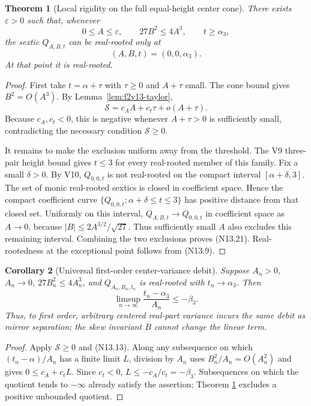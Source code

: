 \documentclass[11pt]{article}
\newtheorem{theorem}{Theorem}[section]
\newtheorem{corollary}[theorem]{Corollary}
\theoremstyle{definition}
\theoremstyle{remark}
\begin{document}
\begin{theorem}[Local rigidity on the full equal-height center cone]
\label{thm:f2v13-local-rigidity}
There exists \(\varepsilon>0\) such that, whenever
\[
 0\leq A\leq\varepsilon,\qquad 27B^2\leq4A^3,\qquad t\geq\alpha _3,
 \tag{N13.20}
\]
the sextic \(Q_{A,B,t}\) can be real-rooted only at
\[
 (A,B,t)=(0,0,\alpha _3).
 \tag{N13.21}
\]
At that point it is real-rooted.
\end{theorem}

\begin{proof}
First take \(t=\alpha+\tau\) with \(\tau\geq0\) and
\(A+\tau\) small.  The cone bound gives \(B^2=O(A^3)\).  By
Lemma~\ref{lem:f2v13-taylor},
\[
 \mathcal S=c_AA+c_t\tau+o(A+\tau).
 \tag{N13.22}
\]
Because \(c_A,c_t<0\), this is negative whenever \(A+\tau>0\) is
sufficiently small, contradicting the necessary condition
\(\mathcal S\geq0\).

It remains to make the exclusion uniform away from the threshold.  The V9
three-pair height bound gives \(t\leq3\) for every real-rooted member of
this family.  Fix a small \(\delta>0\).  By V10,
\(Q_{0,0,t}\) is not real-rooted on the compact interval
\([\alpha+\delta,3]\).  The set of monic real-rooted sextics is closed in
coefficient space.  Hence the compact coefficient curve
\(\{Q_{0,0,t}:\alpha+\delta\leq t\leq3\}\) has positive distance from that
closed set.  Uniformly on this interval,
\(Q_{A,B,t}\to Q_{0,0,t}\) in coefficient space as \(A\to0\), because
\(|B|\leq2A^{3/2}/\sqrt{27}\).  Thus sufficiently small \(A\) also excludes
this remaining interval.  Combining the two exclusions proves
\textup{(N13.21)}.  Real-rootedness at the exceptional point follows from
\textup{(N13.9)}.
\end{proof}

\begin{corollary}[Universal first-order center-variance debit]
\label{cor:f2v13-debit}
Suppose \(A_n>0\), \(A_n\to0\), \(27B_n^2\leq4A_n^3\), and
\(Q_{A_n,B_n,t_n}\) is real-rooted with \(t_n\to\alpha _3\).  Then
\[
 \limsup_{n\to\infty}\frac{t_n-\alpha _3}{A_n}
 \leq-\beta _3.
 \tag{N13.23}
\]
Thus, to first order, arbitrary centered real-part variance incurs the same
debit as mirror separation; the skew invariant \(B\) cannot change the
linear term.
\end{corollary}

\begin{proof}
Apply \(\mathcal S\geq0\) and \textup{(N13.13)}.  Along any subsequence on
which \((t_n-\alpha)/A_n\) has a finite limit \(L\), division by \(A_n\)
uses \(B_n^2/A_n=O(A_n^2)\) and gives
\(0\leq c_A+c_tL\).  Since \(c_t<0\),
\(L\leq-c_A/c_t=-\beta _3\).  Subsequences on which the quotient tends to
\(-\infty\) already satisfy the assertion; Theorem
\ref{thm:f2v13-local-rigidity} excludes a positive unbounded quotient.
\end{proof}
\end{document}
